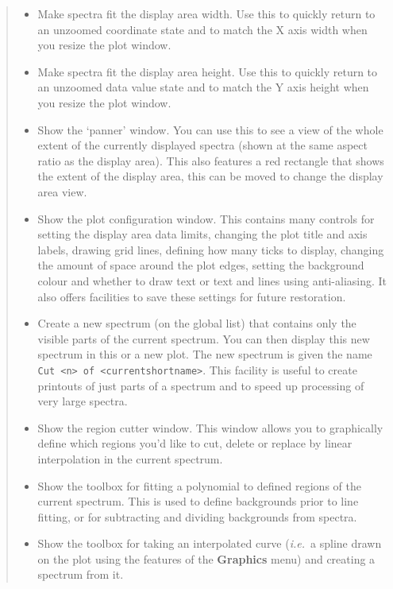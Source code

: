 \documentclass[twoside,11pt]{article}
\newcommand{\htmladdimg}[1]{}
\newcommand{\latexhtml}[2]{#1}
\renewcommand{\_}{\texttt{\symbol{95}}}
\newcommand{\inline}[1]
        {\latexhtml{\texttt{[image: sun243\_figures/\#1]}}
        {\htmladdimg[align=center]{#1.gif}}}
\newcommand{\labelitem}[1]{\textbf{#1}}
\newcommand{\hitext}[1]{\texttt{#1}}
\newcommand{\ie}{\textit{i.e.}}
\begin{document}
\begin{quote}
\begin{itemize}
  \item[\inline{fitwidth}] Make spectra fit the display area width.  Use this
  to quickly return to an unzoomed coordinate state and to match the X axis
  width when you resize the plot window.

  \item[\inline{fitheight}] Make spectra fit the display area height.  Use
  this to quickly return to an unzoomed data value state and to match the Y
  axis height when you resize the plot window.

  \item[\inline{panner}] Show the `panner' window. You can use this to
  see a view of the whole extent of the currently displayed spectra
  (shown at the same aspect ratio as the display area). This also
  features a red rectangle that shows the extent of the display area,
  this can be moved to change the display area view.

  \item[\inline{config}] Show the plot configuration window. This
  contains many controls for setting the display area data limits,
  changing the plot title and axis labels, drawing grid lines,
  defining how many ticks to display, changing the amount of space
  around the plot edges, setting the background colour and whether to
  draw text or text and lines using anti-aliasing. It also offers
  facilities to save these settings for future restoration.

  \item[\inline{cutter}] Create a new spectrum (on the global list)
  that contains only the visible parts of the current spectrum. You
  can then display this new spectrum in this or a new plot. The new
  spectrum is given the name \hitext{Cut <n> of <current\_shortname>}.
  This facility is useful to create printouts of just parts of a
  spectrum and to speed up processing of very large spectra.

  \item[\inline{regioncutter}] Show the region cutter window. This
  window allows you to graphically define which regions you'd like to
  cut, delete or replace by linear interpolation in the current spectrum.

  \item[\inline{fitback}] Show the toolbox for fitting a polynomial to
  defined regions of the current spectrum. This is used to define
  backgrounds prior to line fitting, or for subtracting and dividing
  backgrounds from spectra.

  \item[\inline{interpolate}] Show the toolbox for taking an interpolated
  curve (\ie\ a spline drawn on the plot using the features of the
  \labelitem{Graphics} menu) and creating a spectrum from it.


\end{itemize}
\end{quote}
\end{document}
